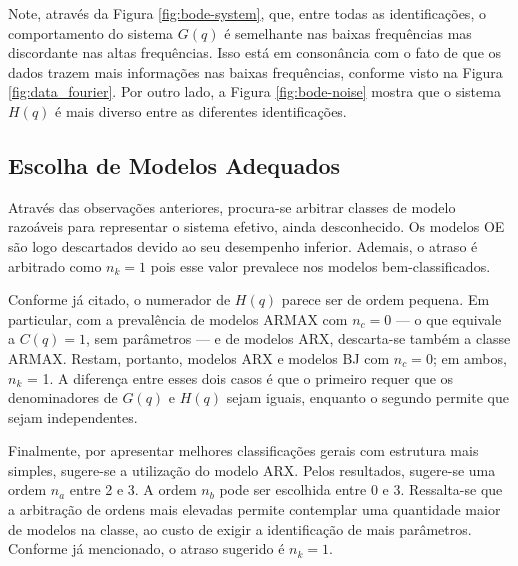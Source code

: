 \documentclass{ppgeesa}
\begin{document}
Note, através da Figura \ref{fig:bode-system}, que, entre todas as identificações, o comportamento do sistema $G(q)$ é semelhante nas baixas frequências mas discordante nas altas frequências.
Isso está em consonância com o fato de que os dados trazem mais informações nas baixas frequências, conforme visto na Figura \ref{fig:data_fourier}.
Por outro lado, a Figura \ref{fig:bode-noise} mostra que o sistema $H(q)$ é mais diverso entre as diferentes identificações.

\subsection{Escolha de Modelos Adequados}
Através das observações anteriores, procura-se arbitrar classes de modelo razoáveis para representar o sistema efetivo, ainda desconhecido.
Os modelos OE são logo descartados devido ao seu desempenho inferior.
Ademais, o atraso é arbitrado como $n_k = 1$ pois esse valor prevalece nos modelos bem-classificados.

Conforme já citado, o numerador de $H(q)$ parece ser de ordem pequena.
Em particular, com a prevalência de modelos ARMAX com $n_c = 0$ --- o que equivale a $C(q) = 1$, sem parâmetros --- e de modelos ARX, descarta-se também a classe ARMAX.
Restam, portanto, modelos ARX e modelos BJ com $n_c = 0$; em ambos, $n_k$ = 1.
A diferença entre esses dois casos é que o primeiro requer que os denominadores de $G(q)$ e $H(q)$ sejam iguais, enquanto o segundo permite que sejam independentes.

Finalmente, por apresentar melhores classificações gerais com estrutura mais simples, sugere-se a utilização do modelo ARX.
Pelos resultados, sugere-se uma ordem $n_a$ entre 2 e 3.
A ordem $n_b$ pode ser escolhida entre 0 e 3.
Ressalta-se que a arbitração de ordens mais elevadas permite contemplar uma quantidade maior de modelos na classe, ao custo de exigir a identificação de mais parâmetros.
Conforme já mencionado, o atraso sugerido é $n_k = 1$.
\end{document}
